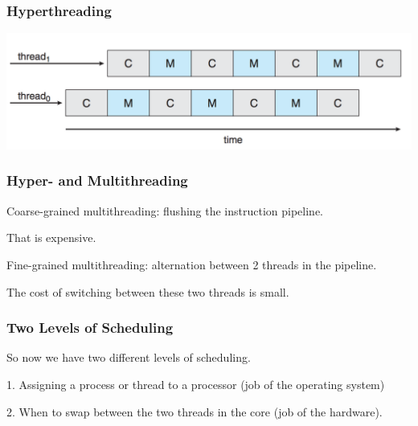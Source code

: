 \begin{frame}
\frametitle{Hyperthreading}

\begin{center}
	\includegraphics[width=\textwidth]{images/hyperthreading.png}
\end{center}

\end{frame}

\begin{frame}
\frametitle{Hyper- and Multithreading}

Coarse-grained multithreading: flushing the instruction pipeline. 

That is expensive. 

Fine-grained multithreading: alternation between 2 threads in the pipeline. 

The cost of switching between these two threads is small.

\end{frame}

\begin{frame}
\frametitle{Two Levels of Scheduling}

So now we have two different levels of scheduling.

1. Assigning a process or thread to a processor (job of the operating system)

2. When to swap between the two threads in the core (job of the hardware). 

\end{frame}




